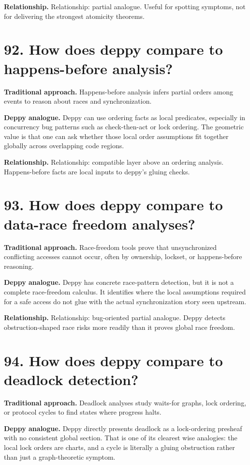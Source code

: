 \documentclass[11pt,openany]{book}
\begin{document}
\textbf{Relationship.} Relationship: partial analogue. Useful for spotting symptoms, not for delivering the strongest atomicity theorems.

\section*{92. How does deppy compare to happens-before analysis?}
\textbf{Traditional approach.} Happens-before analysis infers partial orders among events to reason about races and synchronization.

\textbf{Deppy analogue.} Deppy can use ordering facts as local predicates, especially in concurrency bug patterns such as check-then-act or lock ordering. The geometric value is that one can ask whether those local order assumptions fit together globally across overlapping code regions.

\textbf{Relationship.} Relationship: compatible layer above an ordering analysis. Happens-before facts are local inputs to deppy's gluing checks.

\section*{93. How does deppy compare to data-race freedom analyses?}
\textbf{Traditional approach.} Race-freedom tools prove that unsynchronized conflicting accesses cannot occur, often by ownership, lockset, or happens-before reasoning.

\textbf{Deppy analogue.} Deppy has concrete race-pattern detection, but it is not a complete race-freedom calculus. It identifies where the local assumptions required for a safe access do not glue with the actual synchronization story seen upstream.

\textbf{Relationship.} Relationship: bug-oriented partial analogue. Deppy detects obstruction-shaped race risks more readily than it proves global race freedom.

\section*{94. How does deppy compare to deadlock detection?}
\textbf{Traditional approach.} Deadlock analyses study waits-for graphs, lock ordering, or protocol cycles to find states where progress halts.

\textbf{Deppy analogue.} Deppy directly presents deadlock as a lock-ordering presheaf with no consistent global section. That is one of its clearest wise analogies: the local lock orders are charts, and a cycle is literally a gluing obstruction rather than just a graph-theoretic symptom.
\end{document}

